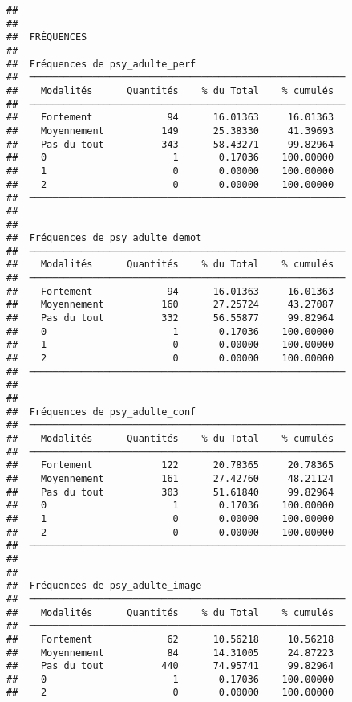 \documentclass[
]{article}
\begin{document}
\begin{verbatim}
## 
## 
##  FRÉQUENCES
## 
##  Fréquences de psy_adulte_perf                           
##  ─────────────────────────────────────────────────────── 
##    Modalités      Quantités    % du Total    % cumulés   
##  ─────────────────────────────────────────────────────── 
##    Fortement             94      16.01363     16.01363   
##    Moyennement          149      25.38330     41.39693   
##    Pas du tout          343      58.43271     99.82964   
##    0                      1       0.17036    100.00000   
##    1                      0       0.00000    100.00000   
##    2                      0       0.00000    100.00000   
##  ─────────────────────────────────────────────────────── 
## 
## 
##  Fréquences de psy_adulte_demot                          
##  ─────────────────────────────────────────────────────── 
##    Modalités      Quantités    % du Total    % cumulés   
##  ─────────────────────────────────────────────────────── 
##    Fortement             94      16.01363     16.01363   
##    Moyennement          160      27.25724     43.27087   
##    Pas du tout          332      56.55877     99.82964   
##    0                      1       0.17036    100.00000   
##    1                      0       0.00000    100.00000   
##    2                      0       0.00000    100.00000   
##  ─────────────────────────────────────────────────────── 
## 
## 
##  Fréquences de psy_adulte_conf                           
##  ─────────────────────────────────────────────────────── 
##    Modalités      Quantités    % du Total    % cumulés   
##  ─────────────────────────────────────────────────────── 
##    Fortement            122      20.78365     20.78365   
##    Moyennement          161      27.42760     48.21124   
##    Pas du tout          303      51.61840     99.82964   
##    0                      1       0.17036    100.00000   
##    1                      0       0.00000    100.00000   
##    2                      0       0.00000    100.00000   
##  ─────────────────────────────────────────────────────── 
## 
## 
##  Fréquences de psy_adulte_image                          
##  ─────────────────────────────────────────────────────── 
##    Modalités      Quantités    % du Total    % cumulés   
##  ─────────────────────────────────────────────────────── 
##    Fortement             62      10.56218     10.56218   
##    Moyennement           84      14.31005     24.87223   
##    Pas du tout          440      74.95741     99.82964   
##    0                      1       0.17036    100.00000   
##    2                      0       0.00000    100.00000   

\end{verbatim}
\end{document}
